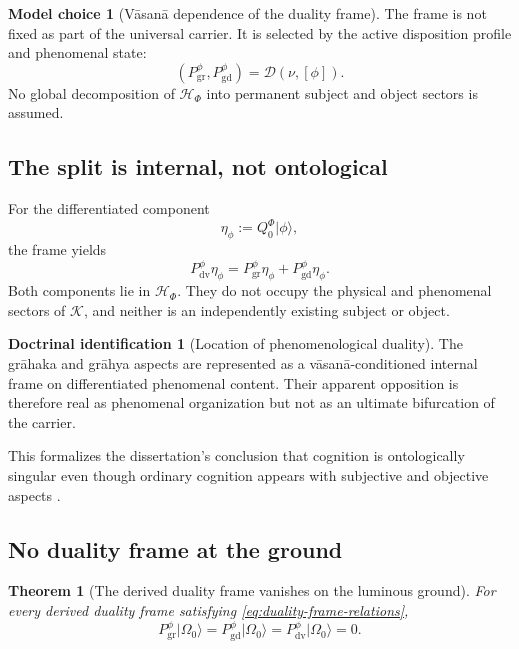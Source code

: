 \documentclass[11pt,reqno]{scrartcl}
\newcommand{\scrK}{\mathscr K}
\newcommand{\scrHF}{\mathscr H_{\Phi}}
\newcommand{\QzeroF}{Q_{0}^{\Phi}}
\newcommand{\ket}[1]{\lvert #1\rangle}
\newcommand{\vas}{\nu}
\newcommand{\Pdual}{P_{\mathrm{dv}}^{\phi}}
\newcommand{\Pgrasper}{P_{\mathrm{gr}}^{\phi}}
\newcommand{\Pgrasped}{P_{\mathrm{gd}}^{\phi}}
\theoremstyle{plain}
\newtheorem{theorem}{Theorem}[section]
\theoremstyle{definition}
\newtheorem{identification}[identification]{Doctrinal identification}
\newtheorem{modelchoice}[modelchoice]{Model choice}
\theoremstyle{remark}
\begin{document}
\begin{modelchoice}[V\=asan\=a dependence of the duality frame]
\label{choice:vasana-dependent-duality-frame}
The frame is not fixed as part of the universal carrier.  It is selected by
the active disposition profile and phenomenal state:
\begin{equation}
  (\Pgrasper,\Pgrasped)
  =\mathcal D(\vas,[\phi]).
  \label{eq:duality-frame-selection-map}
\end{equation}
No global decomposition of $\scrHF$ into permanent subject and object sectors
is assumed.
\end{modelchoice}

\subsection{The split is internal, not ontological}

For the differentiated component
\begin{equation}
  \eta_{\phi}:=\QzeroF\ket\phi,
  \label{eq:differentiated-component-duality}
\end{equation}
the frame yields
\begin{equation}
  \Pdual\eta_{\phi}
  =\Pgrasper\eta_{\phi}
   +\Pgrasped\eta_{\phi}.
  \label{eq:internal-grasper-grasped-split}
\end{equation}
Both components lie in $\scrHF$.  They do not occupy the physical and
phenomenal sectors of $\scrK$, and neither is an independently existing
subject or object.

\begin{identification}[Location of phenomenological duality]
\label{id:derived-duality-location}
The gr\=ahaka and gr\=ahya aspects are represented as a v\=asan\=a-conditioned
internal frame on differentiated phenomenal content.  Their apparent
opposition is therefore real as phenomenal organization but not as an
ultimate bifurcation of the carrier.
\end{identification}

This formalizes the dissertation's conclusion that cognition is
ontologically singular even though ordinary cognition appears with subjective
and objective aspects \cite[pp.~147--156, 220--228, 283--289]{Yiannopoulos2020}.

\subsection{No duality frame at the ground}

\begin{theorem}[The derived duality frame vanishes on the luminous ground]
\label{thm:duality-frame-vanishes-ground}
For every derived duality frame satisfying
\eqref{eq:duality-frame-relations},
\begin{equation}
  \Pgrasper\ket{\Omega_0}
  =\Pgrasped\ket{\Omega_0}
  =\Pdual\ket{\Omega_0}
  =0.
  \label{eq:duality-frame-annihilates-ground}
\end{equation}
\end{theorem}
\end{document}

